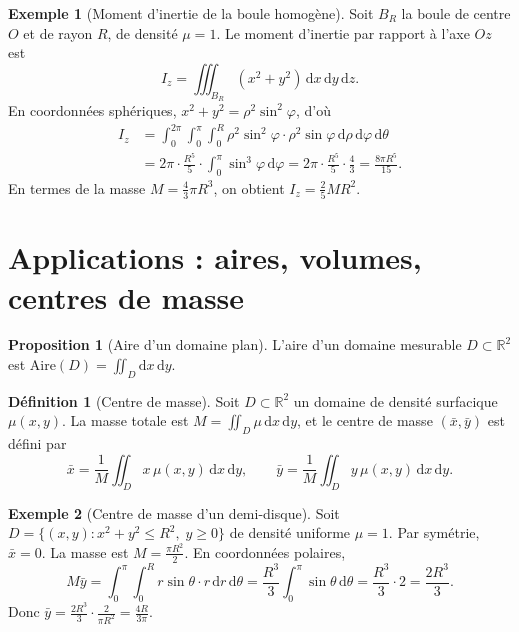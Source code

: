 \documentclass[12pt,a4paper,openany]{book}
\theoremstyle{definition}
\newtheorem{definition}{Définition}[chapter]
\newtheorem{proposition}{Proposition}[chapter]
\newtheorem{exemple}{Exemple}[chapter]
\newcommand{\R}{\mathbb{R}}
\newcommand{\dd}{\mathrm{d}}
\begin{document}
\begin{exemple}[Moment d'inertie de la boule homogène]
  \label{ex:moment-inertie-boule}
  Soit $B_R$ la boule de centre $O$ et de rayon $R$, de densité
  $\mu = 1$. Le moment d'inertie par rapport à l'axe $Oz$ est
  \[
    I_z = \iiint_{B_R}(x^2+y^2)\,\dd x\,\dd y\,\dd z.
  \]
  En coordonnées sphériques, $x^2+y^2 = \rho^2\sin^2\!\varphi$, d'où
  \begin{align*}
    I_z &= \int_0^{2\pi}\!\int_0^\pi\!\int_0^R
    \rho^2\sin^2\!\varphi\cdot\rho^2\sin\varphi\,
    \dd\rho\,\dd\varphi\,\dd\theta \\
    &= 2\pi\cdot\frac{R^5}{5}\cdot\int_0^\pi\sin^3\!\varphi\,\dd\varphi
    = 2\pi\cdot\frac{R^5}{5}\cdot\frac{4}{3}
    = \frac{8\pi R^5}{15}.
  \end{align*}
  En termes de la masse $M = \frac{4}{3}\pi R^3$, on obtient
  $I_z = \frac{2}{5}MR^2$.
\end{exemple}



\section{Applications : aires, volumes, centres de masse}
\label{sec:applications-integrales-multiples}


\begin{proposition}[Aire d'un domaine plan]\label{prop:aire-domaine}
  L'aire d'un domaine mesurable $D \subset \R^2$ est
  $\text{Aire}(D) = \iint_D \dd x\,\dd y$.
\end{proposition}

\begin{definition}[Centre de masse]\label{def:centre-masse}
  Soit $D \subset \R^2$ un domaine de densité surfacique $\mu(x,y)$. La
  masse totale est $M = \iint_D \mu\,\dd x\,\dd y$, et le centre de
  masse $(\bar{x}, \bar{y})$ est défini par
  \[
    \bar{x} = \frac{1}{M}\iint_D x\,\mu(x,y)\,\dd x\,\dd y,
    \qquad
    \bar{y} = \frac{1}{M}\iint_D y\,\mu(x,y)\,\dd x\,\dd y.
  \]
\end{definition}

\begin{exemple}[Centre de masse d'un demi-disque]\label{ex:centre-masse}
  Soit $D = \{(x,y) : x^2+y^2 \leqslant R^2,\; y \geqslant 0\}$
  de densité uniforme $\mu = 1$. Par symétrie, $\bar{x} = 0$. La masse
  est $M = \frac{\pi R^2}{2}$. En coordonnées polaires,
  \[
    M\bar{y} = \int_0^\pi\!\int_0^R r\sin\theta\cdot r\,\dd r\,\dd\theta
    = \frac{R^3}{3}\int_0^\pi\sin\theta\,\dd\theta
    = \frac{R^3}{3}\cdot 2 = \frac{2R^3}{3}.
  \]
  Donc $\bar{y} = \frac{2R^3}{3}\cdot\frac{2}{\pi R^2} = \frac{4R}{3\pi}$.
\end{exemple}
\end{document}
